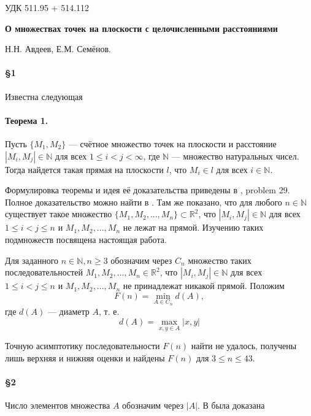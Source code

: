 \documentclass[a4paper,14pt]{article} %
\begin{document}
\large


УДК 511.95 + 514.112

\begin{center}
	\textbf{\LARGE О множествах точек на плоскости с целочисленными расстояниями}

	\vspace{15mm}

	{\Large{Н.Н. Авдеев, Е.М. Семёнов.}}

\end{center}


\paragraph{\S 1} %
Известна следующая

\paragraph{Теорема 1.} Пусть $\{M_1,M_2\}$ --- счётное множество точек на плоскости и расстояние $|M_i,M_j|\in \mathbb{N}$ для всех $1\leq i < j <\infty$, где $\mathbb{N}$ --- множество натуральных чисел. Тогда найдется такая прямая на плоскости $l$, что $M_i\in l$ для всех $i \in \mathbb{N}$.

Формулировка теоремы и идея её доказательства приведены в \cite{Newman}, problem 29. Полное доказательство можно найти в \cite{angem1kurs}.
Там же показано, что для любого $n\in \mathbb{N}$ существует такое множество $\{M_1,M_2,...,M_n\}\subset \mathbb{R}^2$, что $|M_i,M_j|\in\mathbb{N}$ для всех $1\leq i < j  \leq n$ и $M_1, M_2, ..., M_n$ не лежат на прямой.
Изучению таких подмножеств посвящена настоящая работа.


Для заданного $n\in \mathbb{N}, n\geq 3$ обозначим через $C_n$ множество таких последовательностей $M_1,M_2,...,M_n \in \mathbb{R}^2$, что $|M_i,M_j|\in\mathbb{N}$ для всех $1\leq i < j  \leq n$ и  $M_1,M_2,...,M_n$ не принадлежат никакой прямой.
Положим
$$
F(n)=\min\limits_{A\in C_n} d(A),
$$
где $d(A)$ --- диаметр $A$, т. е.
$$
d(A)=\max\limits_{x,y\in A}|x,y|
$$

Точную асимптотику последовательности  $F(n)$ найти не удалось, получены лишь верхняя и нижняя оценки и найдены $F(n)$ для $3\leq n \leq 43$.

\paragraph{\S 2}
Число элементов множества $A$ обозначим через $|A|$.
В \cite{angem1kurs} была доказана
\end{document}

